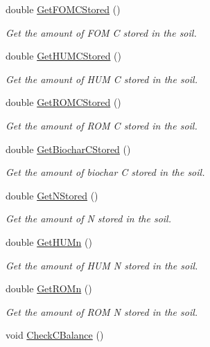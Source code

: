 \begin{DoxyCompactItemize}
double \mbox{\hyperlink{classctool2_a64472639343da0e7e753a2b5f169468e}{Get\+F\+O\+M\+C\+Stored}} ()
\begin{DoxyCompactList}\small\item\em Get the amount of F\+OM C stored in the soil. \end{DoxyCompactList}\item 
double \mbox{\hyperlink{classctool2_af39503c35e1348a77007bb8d52afb436}{Get\+H\+U\+M\+C\+Stored}} ()
\begin{DoxyCompactList}\small\item\em Get the amount of H\+UM C stored in the soil. \end{DoxyCompactList}\item 
double \mbox{\hyperlink{classctool2_a88804d7d3fe9b3132085ce9db3c16b80}{Get\+R\+O\+M\+C\+Stored}} ()
\begin{DoxyCompactList}\small\item\em Get the amount of R\+OM C stored in the soil. \end{DoxyCompactList}\item 
double \mbox{\hyperlink{classctool2_a204d6d2b7576bb7d3c52ac152c637958}{Get\+Biochar\+C\+Stored}} ()
\begin{DoxyCompactList}\small\item\em Get the amount of biochar C stored in the soil. \end{DoxyCompactList}\item 
double \mbox{\hyperlink{classctool2_a17a35e9c9faa7486c87fea08796c64de}{Get\+N\+Stored}} ()
\begin{DoxyCompactList}\small\item\em Get the amount of N stored in the soil. \end{DoxyCompactList}\item 
double \mbox{\hyperlink{classctool2_a4a12ce36b7e85a06e7987e953b08b876}{Get\+H\+U\+Mn}} ()
\begin{DoxyCompactList}\small\item\em Get the amount of H\+UM N stored in the soil. \end{DoxyCompactList}\item 
double \mbox{\hyperlink{classctool2_a31a62472fb74dbafbc296ecd074c8d5e}{Get\+R\+O\+Mn}} ()
\begin{DoxyCompactList}\small\item\em Get the amount of R\+OM N stored in the soil. \end{DoxyCompactList}\item 
void \mbox{\hyperlink{classctool2_ab9e6dc7d7c67b8956d4d5284c32c881b}{Check\+C\+Balance}} ()

\end{DoxyCompactItemize}
